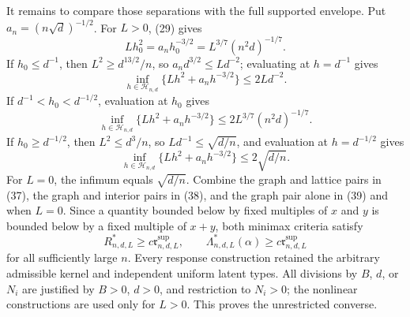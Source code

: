 It remains to compare those separations with the full supported envelope.  Put \(a_n=(n\sqrt d)^{-1/2}\).  For \(L>0\), (29) gives
\[
 Lh_0^2=a_nh_0^{-3/2}=L^{3/7}(n^2d)^{-1/7}.
\tag{36}
\]
If \(h_0\leq d^{-1}\), then \(L^2\geq d^{13/2}/n\), so \(a_nd^{3/2}\leq Ld^{-2}\); evaluating at \(h=d^{-1}\) gives
\[
 \inf_{h\in\mathcal H_{n,d}}\{Lh^2+a_nh^{-3/2}\}\leq2Ld^{-2}.
\tag{37}
\]
If \(d^{-1}<h_0<d^{-1/2}\), evaluation at \(h_0\) gives
\[
 \inf_{h\in\mathcal H_{n,d}}\{Lh^2+a_nh^{-3/2}\}
 \leq2L^{3/7}(n^2d)^{-1/7}.
\tag{38}
\]
If \(h_0\geq d^{-1/2}\), then \(L^2\leq d^3/n\), so \(Ld^{-1}\leq\sqrt{d/n}\), and evaluation at \(h=d^{-1/2}\) gives
\[
 \inf_{h\in\mathcal H_{n,d}}\{Lh^2+a_nh^{-3/2}\}\leq2\sqrt{d/n}.
\tag{39}
\]
For \(L=0\), the infimum equals \(\sqrt{d/n}\).  Combine the graph and lattice pairs in (37), the graph and interior pairs in (38), and the graph pair alone in (39) and when \(L=0\).  Since a quantity bounded below by fixed multiples of \(x\) and \(y\) is bounded below by a fixed multiple of \(x+y\), both minimax criteria satisfy
\[
 R^*_{n,d,L}\geq c\mathfrak r^{\mathrm{sup}}_{n,d,L},
 \qquad \Lambda^*_{n,d,L}(\alpha)\geq c\mathfrak r^{\mathrm{sup}}_{n,d,L}
\tag{40}
\]
for all sufficiently large \(n\).  Every response construction retained the arbitrary admissible kernel and independent uniform latent types.  All divisions by \(B\), \(d\), or \(N_i\) are justified by \(B>0\), \(d>0\), and restriction to \(N_i>0\); the nonlinear constructions are used only for \(L>0\).  This proves the unrestricted converse.